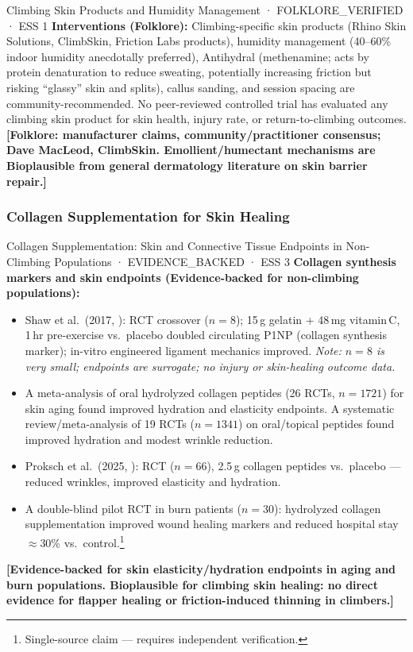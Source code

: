 \begin{folklorebox}{Climbing Skin Products and Humidity Management · FOLKLORE\_VERIFIED · ESS 1}
\textbf{Interventions (Folklore):} Climbing-specific skin products (Rhino Skin Solutions, ClimbSkin, Friction Labs products), humidity management (40--60\% indoor humidity anecdotally preferred), Antihydral (methenamine; acts by protein denaturation to reduce sweating, potentially increasing friction but risking ``glassy'' skin and splits), callus sanding, and session spacing are community-recommended. No peer-reviewed controlled trial has evaluated any climbing skin product for skin health, injury rate, or return-to-climbing outcomes. \textbf{[Folklore: manufacturer claims, community/practitioner consensus; Dave MacLeod, ClimbSkin. Emollient/humectant mechanisms are Bioplausible from general dermatology literature on skin barrier repair.]}
\end{folklorebox}

\subsubsection{Collagen Supplementation for Skin Healing}

\begin{evidencebox}{Collagen Supplementation: Skin and Connective Tissue Endpoints in Non-Climbing Populations · EVIDENCE\_BACKED · ESS 3}
\textbf{Collagen synthesis markers and skin endpoints (Evidence-backed for non-climbing populations):}
\begin{itemize}[leftmargin=1.5em]
  \item Shaw et al.\ (2017, \cite{SLRE17}): RCT crossover ($n=8$); 15\,g gelatin + 48\,mg vitamin\,C, 1\,hr pre-exercise vs.\ placebo doubled circulating P1NP (collagen synthesis marker); in-vitro engineered ligament mechanics improved. \textit{Note: $n=8$ is very small; endpoints are surrogate; no injury or skin-healing outcome data.}
  \item A meta-analysis of oral hydrolyzed collagen peptides (26 RCTs, $n=1721$) for skin aging found improved hydration and elasticity endpoints. A systematic review/meta-analysis of 19 RCTs ($n=1341$) on oral/topical peptides found improved hydration and modest wrinkle reduction.
  \item Proksch et al.\ (2025, \cite{PZO25}): RCT ($n=66$), 2.5\,g collagen peptides vs.\ placebo --- reduced wrinkles, improved elasticity and hydration.
  \item A double-blind pilot RCT in burn patients ($n=30$): hydrolyzed collagen supplementation improved wound healing markers and reduced hospital stay $\approx$30\% vs.\ control.\footnote{Single-source claim --- requires independent verification.}
\end{itemize}
\textbf{[Evidence-backed for skin elasticity/hydration endpoints in aging and burn populations. Bioplausible for climbing skin healing: no direct evidence for flapper healing or friction-induced thinning in climbers.]}
\end{evidencebox}


